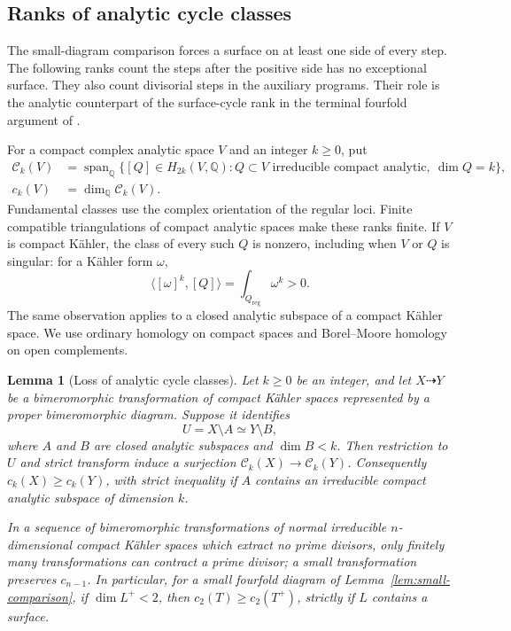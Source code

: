 \documentclass[11pt]{amsart}
\newtheorem{lemma}[theorem]{Lemma}
\theoremstyle{definition}
\theoremstyle{remark}
\numberwithin{equation}{section}
\newcommand{\Q}{\mathbb{Q}}
\begin{document}
\subsection{Ranks of analytic cycle classes}

The small-diagram comparison forces a surface on at least one side of
every step.  The following ranks count the steps after the positive
side has no exceptional surface.  They also count divisorial steps in
the auxiliary programs.  Their role is the analytic counterpart of the
surface-cycle rank in the terminal fourfold argument of
\cite[Theorem~5-1-15 and Lemma~5-1-17]{KawamataMatsudaMatsuki1987}.

For a compact complex analytic space $V$ and an integer $k\geq0$, put
\[
 \begin{split}
 \mathcal C_k(V)&=\operatorname{span}_{\Q}
 \{[Q]\in H_{2k}(V,\Q):
       Q\subset V\text{ irreducible compact analytic},\ \dim Q=k\},\\
 c_k(V)&=\dim_{\Q}\mathcal C_k(V).
 \end{split}
\]
Fundamental classes use the complex orientation of the regular loci.
Finite compatible triangulations of compact analytic spaces make these
ranks finite.  If $V$ is compact K\"ahler, the class of every such $Q$
is nonzero, including when $V$ or $Q$ is singular: for a K\"ahler form
$\omega$,
\[
 \langle[\omega]^k,[Q]\rangle=\int_{Q_{\mathrm{reg}}}\omega^k>0.
\]
The same observation applies to a closed analytic subspace of a
compact K\"ahler space.  We use ordinary homology on compact spaces
and Borel--Moore homology on open complements.

\begin{lemma}[Loss of analytic cycle classes]\label{lem:cycle-loss}
Let $k\geq0$ be an integer, and let $X\dashrightarrow Y$ be a
bimeromorphic transformation of compact K\"ahler spaces represented by
a proper bimeromorphic diagram.
Suppose it identifies
\[
 U=X\setminus A\simeq Y\setminus B,
\]
where $A$ and $B$ are closed analytic subspaces and $\dim B<k$.
Then restriction to $U$ and strict transform induce a surjection
$\mathcal C_k(X)\to\mathcal C_k(Y)$.  Consequently
$c_k(X)\geq c_k(Y)$, with strict inequality if $A$ contains an
irreducible compact analytic subspace of dimension $k$.

In a sequence of bimeromorphic transformations of normal irreducible $n$-dimensional
compact K\"ahler spaces which extract no prime divisors, only finitely
many transformations can contract a prime divisor; a small
transformation preserves $c_{n-1}$.  In particular, for a small
fourfold diagram of Lemma~\ref{lem:small-comparison}, if $\dim L^+<2$,
then $c_2(T)\geq c_2(T^+)$, strictly if $L$ contains a surface.
\end{lemma}
\end{document}
